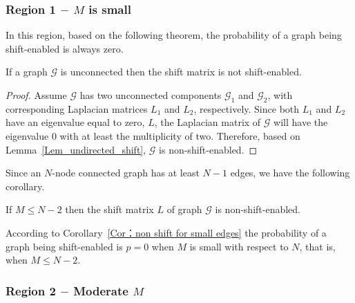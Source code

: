 \documentclass[journal]{IEEEtran}
\begin{document}


\subsubsection{Region 1 $-$ $M$ is small}\label{sec: Region 1}

In this region, based on the following theorem, the probability of a graph being shift-enabled is always zero.

\begin{Thm}{\label{Thm_p_tends_to_zero}}
	If a graph $\mathcal{G}$ is unconnected then the shift matrix is not shift-enabled.
\end{Thm}
\begin{proof}
	Assume $\mathcal{G}$ has two unconnected components ${\mathcal{G}}_1$ and ${\mathcal{G}}_2$, with corresponding Laplacian matrices $L_1$ and $L_2$, respectively. Since both $L_1$ and $L_2$ have an eigenvalue equal to zero, $L$, the Laplacian matrix of $\mathcal{G}$ will have the eigenvalue 0 with at least the multiplicity of two. Therefore, based on Lemma~\ref{Lem_undirected_shift}, $\mathcal{G}$ is non-shift-enabled.
\end{proof}
Since an $N$-node connected graph has at least  $N-1$ edges, we have the following corollary.
\begin{Cor} {\label{Cor：non shift for small edges}}
	If $M\leq N-2$ then the shift matrix $L$ of graph $\mathcal{G}$ is non-shift-enabled. 
\end{Cor}
According to Corollary~\ref{Cor：non shift for small edges} the probability of a graph being shift-enabled is $p=0$ when $M$ is small with respect to $N$, that is, when $M\leq N-2$.



\subsubsection{Region 2 $-$ Moderate $M$}\label{sec: Region 2}
\end{document}
